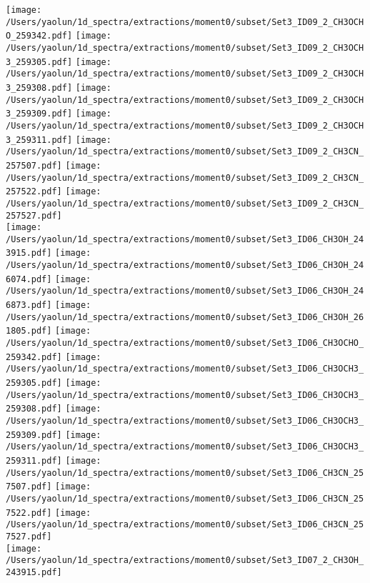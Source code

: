 \begin{figure*}[htbp!]
  \texttt{[image: /Users/yaolun/1d\_spectra/extractions/moment0/subset/Set3\_ID09\_2\_CH3OCHO\_259342.pdf]}
  \texttt{[image: /Users/yaolun/1d\_spectra/extractions/moment0/subset/Set3\_ID09\_2\_CH3OCH3\_259305.pdf]}
  \texttt{[image: /Users/yaolun/1d\_spectra/extractions/moment0/subset/Set3\_ID09\_2\_CH3OCH3\_259308.pdf]}
  \texttt{[image: /Users/yaolun/1d\_spectra/extractions/moment0/subset/Set3\_ID09\_2\_CH3OCH3\_259309.pdf]}
  \texttt{[image: /Users/yaolun/1d\_spectra/extractions/moment0/subset/Set3\_ID09\_2\_CH3OCH3\_259311.pdf]}
  \texttt{[image: /Users/yaolun/1d\_spectra/extractions/moment0/subset/Set3\_ID09\_2\_CH3CN\_257507.pdf]}
  \texttt{[image: /Users/yaolun/1d\_spectra/extractions/moment0/subset/Set3\_ID09\_2\_CH3CN\_257522.pdf]}
  \texttt{[image: /Users/yaolun/1d\_spectra/extractions/moment0/subset/Set3\_ID09\_2\_CH3CN\_257527.pdf]}
  \\
  \texttt{[image: /Users/yaolun/1d\_spectra/extractions/moment0/subset/Set3\_ID06\_CH3OH\_243915.pdf]}
  \texttt{[image: /Users/yaolun/1d\_spectra/extractions/moment0/subset/Set3\_ID06\_CH3OH\_246074.pdf]}
  \texttt{[image: /Users/yaolun/1d\_spectra/extractions/moment0/subset/Set3\_ID06\_CH3OH\_246873.pdf]}
  \texttt{[image: /Users/yaolun/1d\_spectra/extractions/moment0/subset/Set3\_ID06\_CH3OH\_261805.pdf]}
  \texttt{[image: /Users/yaolun/1d\_spectra/extractions/moment0/subset/Set3\_ID06\_CH3OCHO\_259342.pdf]}
  \texttt{[image: /Users/yaolun/1d\_spectra/extractions/moment0/subset/Set3\_ID06\_CH3OCH3\_259305.pdf]}
  \texttt{[image: /Users/yaolun/1d\_spectra/extractions/moment0/subset/Set3\_ID06\_CH3OCH3\_259308.pdf]}
  \texttt{[image: /Users/yaolun/1d\_spectra/extractions/moment0/subset/Set3\_ID06\_CH3OCH3\_259309.pdf]}
  \texttt{[image: /Users/yaolun/1d\_spectra/extractions/moment0/subset/Set3\_ID06\_CH3OCH3\_259311.pdf]}
  \texttt{[image: /Users/yaolun/1d\_spectra/extractions/moment0/subset/Set3\_ID06\_CH3CN\_257507.pdf]}
  \texttt{[image: /Users/yaolun/1d\_spectra/extractions/moment0/subset/Set3\_ID06\_CH3CN\_257522.pdf]}
  \texttt{[image: /Users/yaolun/1d\_spectra/extractions/moment0/subset/Set3\_ID06\_CH3CN\_257527.pdf]}
  \\
  \texttt{[image: /Users/yaolun/1d\_spectra/extractions/moment0/subset/Set3\_ID07\_2\_CH3OH\_243915.pdf]}

\end{figure*}
